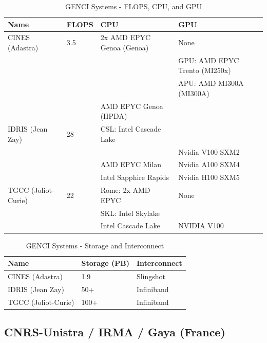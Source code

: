     \begin{table}[!ht]
        \centering
        \begin{tabular}{l l l l}
        \toprule
        \textbf{Name} & \textbf{FLOPS} & \textbf{CPU} & \textbf{GPU} \\
        \midrule
        CINES (Adastra) & 3.5 & 2x AMD EPYC Genoa (Genoa) & None \\
        & & & GPU: AMD EPYC Trento (MI250x)  \\
        & & & APU: AMD MI300A (MI300A)  \\
        & & AMD EPYC Genoa (HPDA) & \\
        IDRIS (Jean Zay) & 28 & CSL: Intel Cascade Lake & \\
        & &                & Nvidia V100 SXM2 \\
        & & AMD EPYC Milan &  Nvidia A100 SXM4\\
        & & Intel Sapphire Rapids & Nvidia H100 SXM5        \\
        TGCC (Joliot-Curie) & 22 & Rome: 2x AMD EPYC  & None \\
        & & SKL:  Intel Skylake & \\
        & & Intel Cascade Lake & NVIDIA V100 \\
        \bottomrule
        \end{tabular}
        \caption{GENCI Systems - FLOPS, CPU, and GPU}
        \label{tab:genci_flops_cpu_gpu}
    \end{table}


    \begin{table}[!ht]
        \centering
        \begin{tabular}{l l l}
        \toprule
        \textbf{Name} & \textbf{Storage (PB)} & \textbf{Interconnect} \\
        \midrule
        CINES (Adastra) & 1.9 & Slingshot \\
        IDRIS (Jean Zay) & 50+ & Infiniband \\
        TGCC (Joliot-Curie) & 100+ & Infiniband \\
        \bottomrule
        \end{tabular}
        \caption{GENCI Systems - Storage and Interconnect}
        \label{tab:genci_storage_interconnect}
    \end{table}

\subsection*{CNRS-Unistra / IRMA / Gaya (France)}
\label{sec:arch:gaya}

